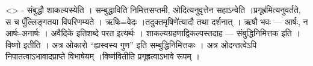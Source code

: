 \textless{}\textgreater{} - संबुद्धौ शाकल्यस्येति । सम्बुद्धाविति
निमित्तसप्तमी, ओदित्यनुवृत्तेन सहाऽन्वेति ।प्रगृह्र॑मित्यनुवर्तते, स च
पुँल्लिङ्गतया विपरिणम्यते । ऋषिः=वेदः ।तदुक्तमृषिणे॑त्यादौ तथा दर्शनात्
। ऋषौ भवः --- आर्षः, न आर्षः-अनार्षः । अवैदिके इतिशब्दे परत इत्यर्थः ।
शाकल्यग्रहणाद्विकल्पस्तदाह --- संबुद्धिनिमित्तक इति । विष्णो इतीति ।
अत्र ओकारो ``ह्यस्वस्य गुण'' इति सम्बुद्धिनिमित्तकः । अत्र ओदन्तत्वेऽपि
निपातत्वाऽभावादप्राप्ते विभाषेयम् ।विष्ण॑वितीति प्रगृह्रत्वाऽभावे रूपम्
।
